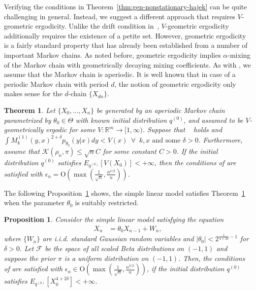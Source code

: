 \documentclass[11pt]{amsart}
\newcommand{\data}{X_0,\dots,X_n}
\newtheorem{theorem}{Theorem}[section]
\newtheorem{proposition}{Proposition}[section]
\begin{document}
Verifying the conditions in Theorem~\ref{thm:gen-nonstationary-hajek} can be quite challenging in general.
Instead, we suggest a different approach that requires $V$-geometric ergodicity.
Unlike the drift condition in~, $V$-geometric ergodicity additionally requires the existence of a petite set. However, geometric ergodicity is a fairly standard property that has already been established from a number of important Markov chains.
As noted before, geometric ergodicity implies $\alpha$-mixing of the Markov chain with geometrically decaying mixing coefficients. As with , we assume that the Markov chain is aperiodic. It is well known that in case of a periodic Markov chain with period $d$, the notion of geometric ergodicity only makes sense for the $d$-chain $\{X_{dn}\}.$%
\begin{theorem}\label{thm:lip-gen-ns}
 Let $\{\data\}$ be generated by an aperiodic Markov chain parametrized by $\theta_0 \in \Theta$ with known initial distribution $q^{(0)}$, and assumed to be $V$-geometrically ergodic for some $V : \mathbb R^m \to [1,\infty)$. Suppose that ~ holds and $\int M^{(1)}_k(y,x)^{2+\delta} p_{\theta_0}(y|x) dy  < V(x)\enspace \forall \enspace k,x \text{ and some }\delta>0$. Furthermore, assume that $\mathcal{K}(\rho_n,\pi)\leq \sqrt{n}C$ for some constant $C>0$. If the initial distribution $q^{(0)}$ satisfies $E_{q^{(0)}}[V(X_0)] < +\infty$, then the conditions of  are satisfied with $\epsilon_n=\mathrm{O}\left(\max(\frac{1}{\sqrt{n}},\frac{n^{\delta/2}}{n})\right)$.
\end{theorem}
{
%
%
}
%
The following Proposition~\ref{ex:slm} shows, the simple linear model satisfies Theorem~\ref{thm:lip-gen-ns} when the parameter $\theta_0$ is suitably restricted.  
%

\begin{proposition}\label{ex:slm}
Consider the {simple linear model} satisfying the equation
\begin{align}
    X_n & = \theta_0 X_{n-1}+W_n,
\end{align}
where $\{W_n\}$ are i.i.d. standard Gaussian random variables and $|\theta_0| < 2^{\frac{1}{4+2\delta}-1}$ for $\delta > 0$. Let $\mathcal{F}$ be the space of all scaled Beta distributions on $(-1,1)$ and suppose the prior $\pi$ is a uniform distribution on $(-1,1)$. Then, the conditions of  are satisfied with $\epsilon_n \in \mathrm{O}\left(\max(\frac{1}{\sqrt{n}},\frac{n^{\delta/2}}{n})\right)$, if the initial distribution $q^{(0)}$ satisfies $ E_{q^{(0)}}[X_0^{4+2\delta}] < +\infty$.
\end{proposition}
\end{document}
